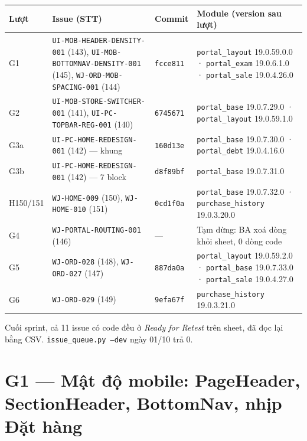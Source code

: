 \begin{center}
\footnotesize
\begin{tabularx}{\textwidth}{>{\raggedright\arraybackslash}p{1.6cm}>{\raggedright\arraybackslash}p{4.3cm}>{\raggedright\arraybackslash}p{1.5cm}>{\raggedright\arraybackslash}X}
\toprule
Lượt & Issue (STT) & Commit & Module (version sau lượt) \\
\midrule
G1 & \texttt{UI-MOB-HEADER-DENSITY-001} (143), \texttt{UI-MOB-BOTTOMNAV-DENSITY-001} (145), \texttt{WJ-ORD-MOB-SPACING-001} (144) &
  \texttt{fcce811} & \texttt{portal\_layout} 19.0.59.0.0 · \texttt{portal\_exam} 19.0.6.1.0 · \texttt{portal\_sale} 19.0.4.26.0 \\
G2 & \texttt{UI-MOB-STORE-SWITCHER-001} (141), \texttt{UI-PC-TOPBAR-REG-001} (140) &
  \texttt{6745671} & \texttt{portal\_base} 19.0.7.29.0 · \texttt{portal\_layout} 19.0.59.1.0 \\
G3a & \texttt{UI-PC-HOME-REDESIGN-001} (142) --- khung &
  \texttt{160d13e} & \texttt{portal\_base} 19.0.7.30.0 · \texttt{portal\_debt} 19.0.4.16.0 \\
G3b & \texttt{UI-PC-HOME-REDESIGN-001} (142) --- 7 block &
  \texttt{d8f89bf} & \texttt{portal\_base} 19.0.7.31.0 \\
H150/151 & \texttt{WJ-HOME-009} (150), \texttt{WJ-HOME-010} (151) &
  \texttt{0cd1f0a} & \texttt{portal\_base} 19.0.7.32.0 · \texttt{purchase\_history} 19.0.3.20.0 \\
G4 & \texttt{WJ-PORTAL-ROUTING-001} (146) & --- & Tạm dừng: BA xoá dòng khỏi sheet, 0 dòng code \\
G5 & \texttt{WJ-ORD-028} (148), \texttt{WJ-ORD-027} (147) &
  \texttt{887da0a} & \texttt{portal\_layout} 19.0.59.2.0 · \texttt{portal\_base} 19.0.7.33.0 · \texttt{portal\_sale} 19.0.4.27.0 \\
G6 & \texttt{WJ-ORD-029} (149) &
  \texttt{9efa67f} & \texttt{purchase\_history} 19.0.3.21.0 \\
\bottomrule
\end{tabularx}
\end{center}

Cuối sprint, cả 11 issue có code đều ở \emph{Ready for Retest} trên sheet, đã đọc lại bằng CSV.
\texttt{issue\_queue.py --dev} ngày 01/10 trả 0.

\section{G1 --- Mật độ mobile: PageHeader, SectionHeader, BottomNav, nhịp Đặt hàng}

